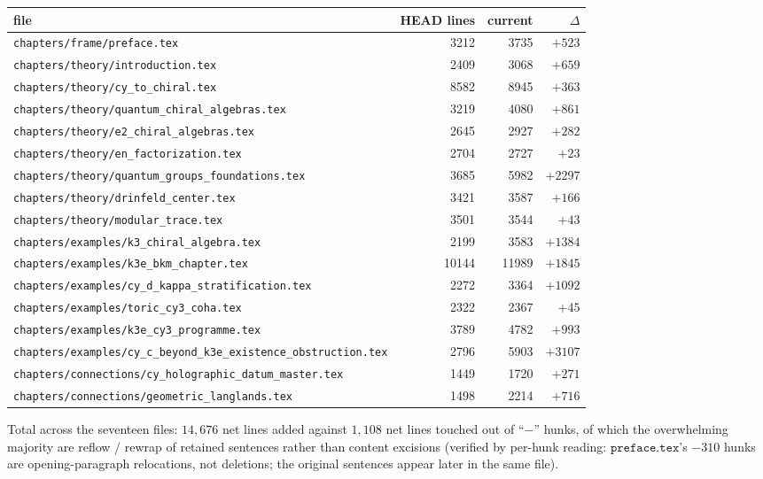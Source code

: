 \begin{center}
\small
\begin{tabular}{lrrr}
\toprule
file & HEAD lines & current & $\Delta$ \\
\midrule
\texttt{chapters/frame/preface.tex}                       & 3212  & 3735  & $+523$  \\
\texttt{chapters/theory/introduction.tex}                 & 2409  & 3068  & $+659$  \\
\texttt{chapters/theory/cy\_to\_chiral.tex}               & 8582  & 8945  & $+363$  \\
\texttt{chapters/theory/quantum\_chiral\_algebras.tex}    & 3219  & 4080  & $+861$  \\
\texttt{chapters/theory/e2\_chiral\_algebras.tex}         & 2645  & 2927  & $+282$  \\
\texttt{chapters/theory/en\_factorization.tex}            & 2704  & 2727  & $+23$   \\
\texttt{chapters/theory/quantum\_groups\_foundations.tex} & 3685  & 5982  & $+2297$ \\
\texttt{chapters/theory/drinfeld\_center.tex}             & 3421  & 3587  & $+166$  \\
\texttt{chapters/theory/modular\_trace.tex}               & 3501  & 3544  & $+43$   \\
\texttt{chapters/examples/k3\_chiral\_algebra.tex}        & 2199  & 3583  & $+1384$ \\
\texttt{chapters/examples/k3e\_bkm\_chapter.tex}          & 10144 & 11989 & $+1845$ \\
\texttt{chapters/examples/cy\_d\_kappa\_stratification.tex} & 2272 & 3364 & $+1092$ \\
\texttt{chapters/examples/toric\_cy3\_coha.tex}           & 2322  & 2367  & $+45$   \\
\texttt{chapters/examples/k3e\_cy3\_programme.tex}        & 3789  & 4782  & $+993$  \\
\texttt{chapters/examples/cy\_c\_beyond\_k3e\_existence\_obstruction.tex} & 2796 & 5903 & $+3107$ \\
\texttt{chapters/connections/cy\_holographic\_datum\_master.tex} & 1449 & 1720 & $+271$ \\
\texttt{chapters/connections/geometric\_langlands.tex}    & 1498  & 2214  & $+716$  \\
\bottomrule
\end{tabular}
\end{center}

Total across the seventeen files: $14{,}676$ net lines added against
$1{,}108$ net lines touched out of ``$-$'' hunks, of which the overwhelming
majority are reflow / rewrap of retained sentences rather than content
excisions (verified by per-hunk reading: $\texttt{preface.tex}$'s $-310$
hunks are opening-paragraph relocations, not deletions; the original
sentences appear later in the same file).

